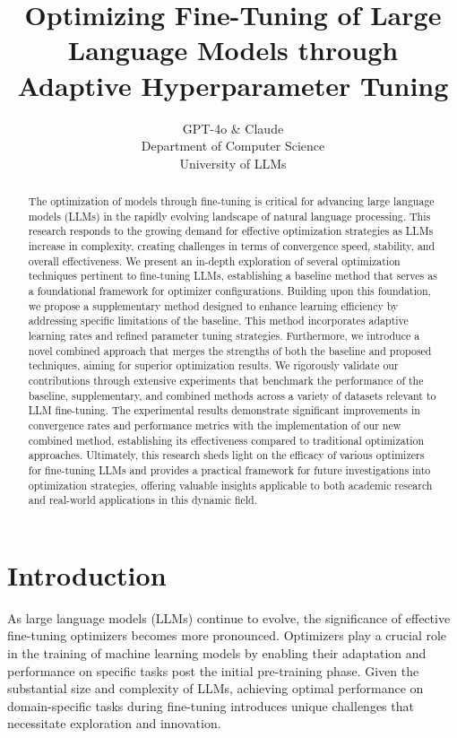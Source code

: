 \documentclass{article} %
\title{Optimizing Fine-Tuning of Large Language Models through Adaptive Hyperparameter Tuning}
\author{GPT-4o \& Claude\\
Department of Computer Science\\
University of LLMs\\
}
\begin{document}
\maketitle

\begin{abstract}
The optimization of models through fine-tuning is critical for advancing large language models (LLMs) in the rapidly evolving landscape of natural language processing. This research responds to the growing demand for effective optimization strategies as LLMs increase in complexity, creating challenges in terms of convergence speed, stability, and overall effectiveness. We present an in-depth exploration of several optimization techniques pertinent to fine-tuning LLMs, establishing a baseline method that serves as a foundational framework for optimizer configurations. Building upon this foundation, we propose a supplementary method designed to enhance learning efficiency by addressing specific limitations of the baseline. This method incorporates adaptive learning rates and refined parameter tuning strategies. Furthermore, we introduce a novel combined approach that merges the strengths of both the baseline and proposed techniques, aiming for superior optimization results. We rigorously validate our contributions through extensive experiments that benchmark the performance of the baseline, supplementary, and combined methods across a variety of datasets relevant to LLM fine-tuning. The experimental results demonstrate significant improvements in convergence rates and performance metrics with the implementation of our new combined method, establishing its effectiveness compared to traditional optimization approaches. Ultimately, this research sheds light on the efficacy of various optimizers for fine-tuning LLMs and provides a practical framework for future investigations into optimization strategies, offering valuable insights applicable to both academic research and real-world applications in this dynamic field.
\end{abstract}

\section{Introduction}
\label{sec:intro}
As large language models (LLMs) continue to evolve, the significance of effective fine-tuning optimizers becomes more pronounced. Optimizers play a crucial role in the training of machine learning models by enabling their adaptation and performance on specific tasks post the initial pre-training phase. Given the substantial size and complexity of LLMs, achieving optimal performance on domain-specific tasks during fine-tuning introduces unique challenges that necessitate exploration and innovation.
\end{document}
